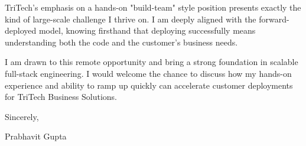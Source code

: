 \documentclass[11pt,a4paper]{article}
\begin{document}
\noindent TriTech's emphasis on a hands-on "build-team" style position presents exactly the kind of large-scale challenge I thrive on. I am deeply aligned with the forward-deployed model, knowing firsthand that deploying successfully means understanding both the code and the customer's business needs.

\noindent I am drawn to this remote opportunity and bring a strong foundation in scalable full-stack engineering. I would welcome the chance to discuss how my hands-on experience and ability to ramp up quickly can accelerate customer deployments for TriTech Business Solutions.

\vspace{10pt}

\noindent Sincerely,

\vspace{10pt}

\noindent Prabhavit Gupta
\end{document}
